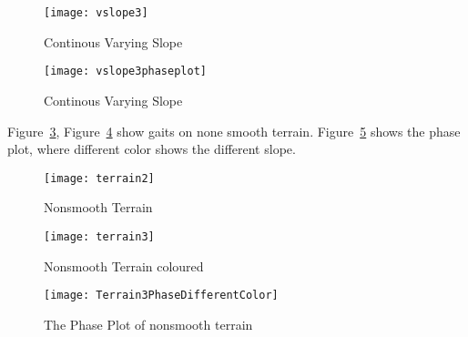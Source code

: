 \begin{figure}[!htbp]
  \begin{center}
      \texttt{[image: vslope3]}
    \caption{Continous Varying Slope}
    \label{fig:vp2}
\end{center}
\end{figure}


\begin{figure}[!htbp]
  \begin{center}
      \texttt{[image: vslope3phaseplot]}
    \caption{Continous Varying Slope}
    \label{fig:vp2phas}
\end{center}
\end{figure}



Figure~\ref{fig:nonsmoothterrain1}, Figure~\ref{fig:nonsmootterrain2} show gaits on none smooth terrain.
Figure~\ref{fig:diffterrain2} shows the phase plot, where different color shows the different slope.
\begin{figure}[!htbp]
  \begin{center}
      \texttt{[image: terrain2]}
    \caption{Nonsmooth Terrain }
    \label{fig:nonsmoothterrain1}
\end{center}
\end{figure}

\begin{figure}[!htbp]
  \begin{center}
      \texttt{[image: terrain3]}
    \caption{Nonsmooth Terrain coloured}
    \label{fig:nonsmootterrain2}
\end{center}
\end{figure}


\begin{figure}[!htbp]
  \begin{center}
    \texttt{[image: Terrain3PhaseDifferentColor]}
    \caption{The Phase Plot of nonsmooth terrain}
    \label{fig:diffterrain2}
\end{center}
\end{figure}






